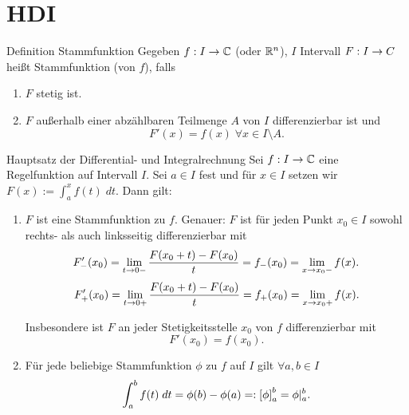\documentclass[main.tex]{subfiles}
\begin{document}
\section*{HDI}

\begin{karte}{Definition Stammfunktion}
    Gegeben \( \abb{f}{I}{\C} \) (oder \( \R^n \)), 
    \(I\) Intervall    
    \( \abb{F}{I}{C} \) heißt Stammfunktion (von \(f\)), falls
    \begin{enumerate}
        \item \(F\) stetig ist.
        \item \(F\) außerhalb einer abzählbaren Teilmenge 
        \( A \) von \( I \) differenzierbar ist und 
        \[ F'(x) = f(x) \; \forall x\in I \setminus A. \]
    \end{enumerate}
\end{karte}

\begin{karte}{Hauptsatz der Differential- und Integralrechnung}
    Sei \( \abb{f}{I}{\C} \) eine Regelfunktion 
    auf Intervall \(I\). Sei \(a \in I\) fest und 
    für \( x\in I \) setzen wir 
    \( F(x) := \int_a^x f(t) \; dt. \)
    Dann gilt: 
    \begin{enumerate}
        \item \(F\) ist eine Stammfunktion zu \(f\).
        Genauer: \( F \) ist für jeden Punkt 
        \( x_0 \in I \) sowohl rechts- als auch linksseitig 
        differenzierbar mit 
        \[ F'_-(x_0) = \limesx{t}{0-} 
        \frac{F(x_0 + t) - F(x_0)}{t} 
        = f_-(x_0) = \limesx{x}{x_0-} f(x). \]
        \[ F'_+(x_0) = \limesx{t}{0+} 
        \frac{F(x_0 + t) - F(x_0)}{t} 
        = f_+(x_0) = \limesx{x}{x_0+} f(x). \]
        
        Insbesondere ist \(F\) an jeder Stetigkeitsstelle 
        \( x_0 \) von \(f\) differenzierbar mit 
        \[ F'(x_0) = f(x_0). \]
        \item Für jede beliebige Stammfunktion \(\phi \) 
        zu \(f\) auf \(I\) gilt \( \forall a,b \in I \)
        \[ \integralx{f(t)}{a}{b}{t} = \phi(b)-\phi(a) 
        =: \left[ \phi \right]^b_a = \phi \vert_a^b. \]
    \end{enumerate}
\end{karte}
\end{document}
